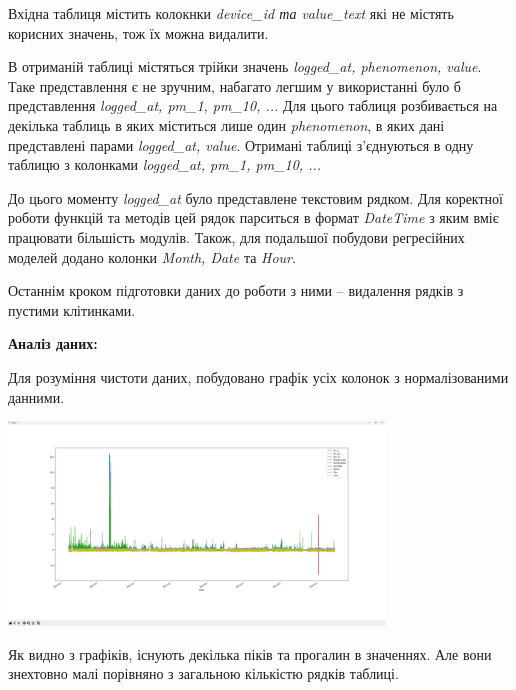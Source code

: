 \documentclass{article}
\begin{document}
Вхідна таблиця містить колокнки \textit{device\_id та value\_text} які не містять корисних значень, тож їх можна видалити.\indent

В отриманій таблиці містяться трійки значень \textit{logged\_at, phenomenon, value}. Таке представлення є не зручним, набагато легшим у використанні було б представлення \textit{logged\_at, pm\_1, pm\_10, ...} Для цього таблиця розбивається на декілька таблиць в яких міститься лише один \textit{phenomenon}, в яких дані представлені парами \textit{logged\_at, value}. Отримані таблиці з'єднуються в одну таблицю з колонками \textit{logged\_at, pm\_1, pm\_10, ...}\indent

До цього моменту \textit{logged\_at} було представлене текстовим рядком. Для коректної роботи функцій та методів цей рядок парситься в формат \textit{DateTime} з яким вміє працювати більшість модулів. Також, для подальшої побудови регресійних моделей додано колонки \textit{Month, Date} та \textit{Hour}.\indent

Останнім кроком підготовки даних до роботи з ними -- видалення рядків з пустими клітинками.\indent
\newpage


\textbf{Аналіз даних:}\\\indent    

Для розуміння чистоти даних, побудовано графік усіх колонок з нормалізованими данними.\\\indent
\begin{center}
    \includegraphics[width=100mm]{norm}
\end{center}

Як видно з графіків, існують декілька піків та прогалин в значеннях. Але вони знехтовно малі порівняно з загальною кількістю рядків таблиці.\\\indent
\end{document}
